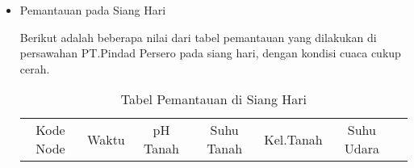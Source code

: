        \begin{itemize}
           \item Pemantauan pada Siang Hari
           
           Berikut adalah beberapa nilai dari tabel pemantauan yang dilakukan di persawahan PT.Pindad Persero pada siang hari, dengan kondisi cuaca cukup cerah.
           
           \begin{table}[H] 
            	\centering 
            	\caption{Tabel Pemantauan di Siang Hari}
            	\label{tab:Tabel Pemantauan di Siang Hari}
            	\begin{tabular}{ccccccc}
            		\toprule
            		 Kode Node & Waktu & pH Tanah & Suhu Tanah & Kel.Tanah & Suhu Udara \\
            

\end{tabular}
\end{table}
\end{itemize}
